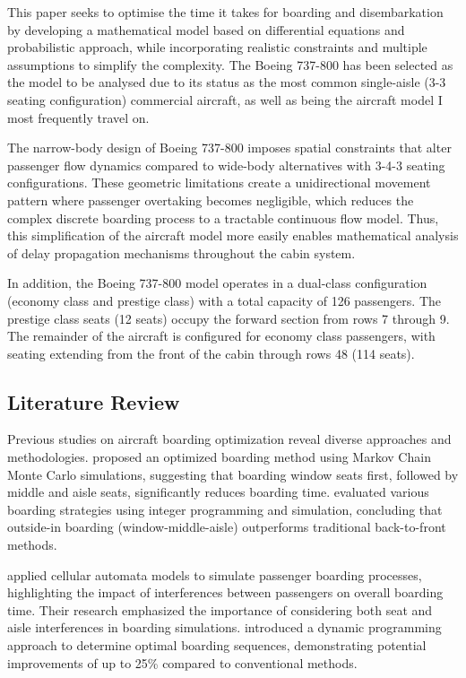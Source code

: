 \documentclass[a4paper,12pt]{article}
\begin{document}
This paper seeks to optimise the time it takes for boarding and disembarkation by developing a mathematical model based on differential equations and probabilistic approach, while incorporating realistic constraints and multiple assumptions to simplify the complexity. The Boeing 737-800 has been selected as the model to be analysed due to its status as the most common single-aisle (3-3 seating configuration) commercial aircraft, as well as being the aircraft model I most frequently travel on.

The narrow-body design of Boeing 737-800 imposes spatial constraints that alter passenger flow dynamics compared to wide-body alternatives with 3-4-3 seating configurations. These geometric limitations create a unidirectional movement pattern where passenger overtaking becomes negligible, which reduces the complex discrete boarding process to a tractable continuous flow model. Thus, this simplification of the aircraft model more easily enables mathematical analysis of delay propagation mechanisms throughout the cabin system.

In addition, the Boeing 737-800 model operates in a dual-class configuration (economy class and prestige class) with a total capacity of 126 passengers. The prestige class seats (12 seats) occupy the forward section from rows 7 through 9. The remainder of the aircraft is configured for economy class passengers, with seating extending from the front of the cabin through rows 48 (114 seats).

\subsection{Literature Review}

Previous studies on aircraft boarding optimization reveal diverse approaches and methodologies. \citet{steffen2008optimal} proposed an optimized boarding method using Markov Chain Monte Carlo simulations, suggesting that boarding window seats first, followed by middle and aisle seats, significantly reduces boarding time. \citet{vandenbriel2005} evaluated various boarding strategies using integer programming and simulation, concluding that outside-in boarding (window-middle-aisle) outperforms traditional back-to-front methods.

\citet{ferrari2005} applied cellular automata models to simulate passenger boarding processes, highlighting the impact of interferences between passengers on overall boarding time. Their research emphasized the importance of considering both seat and aisle interferences in boarding simulations. \citet{milne2014} introduced a dynamic programming approach to determine optimal boarding sequences, demonstrating potential improvements of up to 25\% compared to conventional methods.
\end{document}
